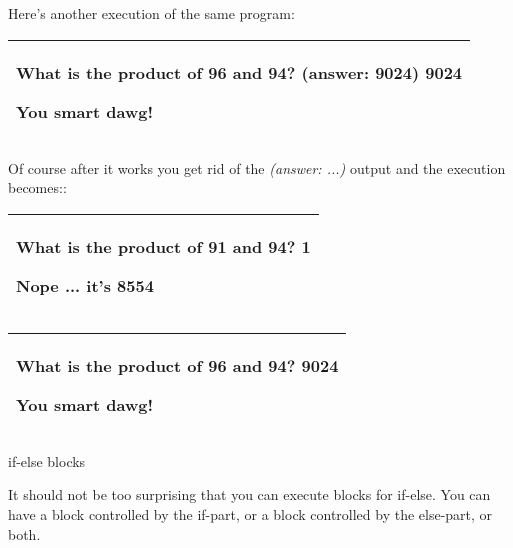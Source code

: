 \documentclass[
]{article}
\begin{document}
Here's another execution of the same program:

\begin{longtable}[]{@{}l@{}}
\toprule
\endhead
\begin{minipage}[t]{0.97\columnwidth}\raggedright
What is the product of 96 and 94? (answer: 9024) \textbf{9024}

You smart dawg!\strut
\end{minipage}\tabularnewline
\bottomrule
\end{longtable}

Of course after it works you get rid of the \emph{(answer: ...)} output
and the execution becomes::

\begin{longtable}[]{@{}l@{}}
\toprule
\endhead
\begin{minipage}[t]{0.97\columnwidth}\raggedright
What is the product of 91 and 94? \textbf{1}

Nope ... it's 8554\strut
\end{minipage}\tabularnewline
\bottomrule
\end{longtable}

\begin{longtable}[]{@{}l@{}}
\toprule
\endhead
\begin{minipage}[t]{0.97\columnwidth}\raggedright
What is the product of 96 and 94? \textbf{9024}

You smart dawg!\strut
\end{minipage}\tabularnewline
\bottomrule
\end{longtable}

if-else blocks

It should not be too surprising that you can execute blocks for if-else.
You can have a block controlled by the if-part, or a block controlled by
the else-part, or both.
\end{document}

